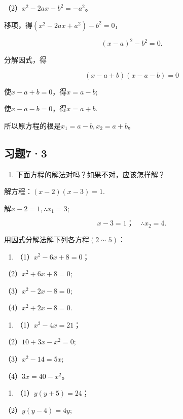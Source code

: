 （2）\(x^{2} - 2ax - b^{2} = -a^{2}\)。

移项，得\((x^{2}-2ax+a^{2})-b^{2}=0\)，

\[
(x - a) ^ {2} - b ^ {2} = 0.
\]

分解因式，得

\[
(x - a + b) (x - a - b) = 0
\]

使\(x - a + b = 0\)，得\(x = a - b;\)

使\(x - a - b = 0\)，得\(x = a + b.\)

所以原方程的根是\(x_{1} = a - b, x_{2} = a + b\)。

\subsection{习题7·3}

\begin{enumerate}
\item
  下面方程的解法对吗？如果不对，应该怎样解？
\end{enumerate}

解方程：\((x - 2)(x - 3) = 1.\)

解\(x - 2 = 1, \therefore x_{1} = 3;\)

\[
x - 3 = 1\text{；} \quad \therefore x _ {2} = 4.
\]

用因式分解法解下列各方程\((2\sim5)\)：

\begin{enumerate}[start=2]
\item
  （1）\(x^{2} - 6x + 8 = 0\)；
\end{enumerate}

（2）\(x^{2} + 6x + 8 = 0;\)

（3）\(x^{2} - 2x - 8 = 0;\)

（4）\(x^{2} + 2x - 8 = 0.\)

\begin{enumerate}[start=3]
\item
  （1）\(x^{2} - 4x = 21\)；
\end{enumerate}

（2）\(10 + 3x - x^2 = 0;\)

（3）\(x^{2} - 14 = 5x;\)

（4）\(3x = 40 - x^2\)。

\begin{enumerate}[start=4]
\item
  （1）\(y(y + 5) = 24\)；
\end{enumerate}

（2）\(y(y - 4) = 4y;\)

